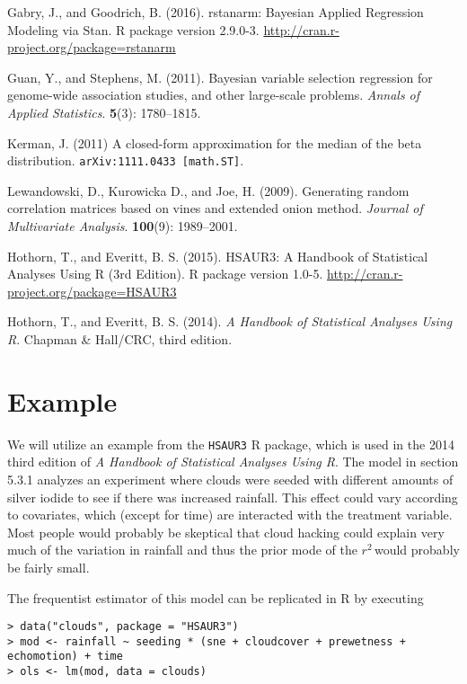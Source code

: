 \documentclass[11pt]{article}
\newcommand{\Rsq}{$r^2\,$}
\begin{document}
\noindent

\bibitem Gabry, J., and Goodrich, B. (2016). rstanarm: Bayesian Applied
Regression Modeling via Stan. R package version 2.9.0-3.
\url{http://cran.r-project.org/package=rstanarm}

\bibitem Guan, Y., and Stephens, M. (2011). Bayesian variable selection
regression for genome-wide association studies, and other large-scale problems.
\emph{Annals of Applied Statistics}. {\bf 5}(3): 1780--1815.

\bibitem Kerman, J. (2011) A closed-form approximation for the median of the
beta distribution. {\tt arXiv:1111.0433 [math.ST]}.

\bibitem Lewandowski, D., Kurowicka D., and Joe, H. (2009). Generating random
correlation matrices based on vines and extended onion method.
\emph{Journal of Multivariate Analysis}. {\bf 100}(9): 1989--2001.

\bibitem Hothorn, T., and Everitt, B. S. (2015).  HSAUR3: A Handbook of
Statistical Analyses Using R (3rd Edition). R package version 1.0-5.
\url{http://cran.r-project.org/package=HSAUR3}

\bibitem Hothorn, T., and Everitt, B. S. (2014). \emph{A Handbook of
Statistical Analyses Using R}. Chapman \& Hall/CRC, third edition.


\appendix
\clearpage
\section{Example}


We will utilize an example from the {\tt HSAUR3} R package, which is used in the
2014 third edition of \emph{A Handbook of Statistical Analyses Using R}.
The model in section 5.3.1 analyzes an experiment where clouds were seeded
with different amounts of silver iodide to see if there was increased rainfall.
This effect could vary according to covariates, which (except for time) are
interacted with the treatment variable. Most people would probably be skeptical
that cloud hacking could explain very much of the variation in rainfall and
thus the prior mode of the \Rsq would probably be fairly small.

The frequentist estimator of this model can be replicated in R by executing

\begin{lstlisting}
> data("clouds", package = "HSAUR3")
> mod <- rainfall ~ seeding * (sne + cloudcover + prewetness + echomotion) + time
> ols <- lm(mod, data = clouds)
\end{lstlisting}
\end{document}
